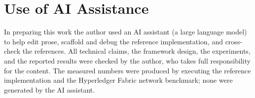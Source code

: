 \documentclass[conference]{IEEEtran}
\begin{document}
\section*{Use of AI Assistance}
In preparing this work the author used an AI assistant (a large language model) to help edit prose, scaffold and debug the reference implementation, and cross-check the references. All technical claims, the framework design, the experiments, and the reported results were checked by the author, who takes full responsibility for the content. The measured numbers were produced by executing the reference implementation and the Hyperledger Fabric network benchmark; none were generated by the AI assistant.



\end{document}
